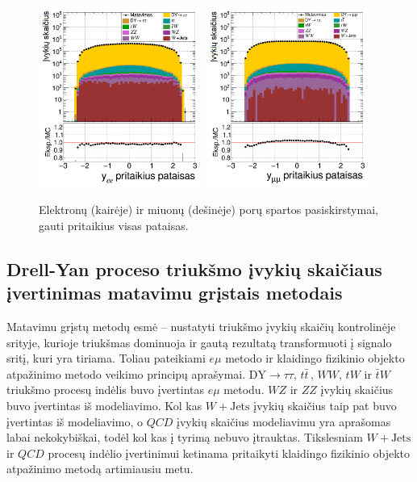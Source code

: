 \documentclass[a4paper, 12pt, oneside]{article}
\newcommand{\emu}{e\mu}
\newcommand{\WJets}{W\! +\!\mathrm{Jets}}
\newcommand{\DYtau}{\mathrm{DY} \! \rightarrow \! \tau\tau}
\newcommand{\QCD}{QC\! D}
\begin{document}
\begin{figure}[H]
	\includegraphics[width=0.48\textwidth]{ee_rapi_after.png}
	\includegraphics[width=0.48\textwidth]{mumu_rapi_after.png}
	\caption{\label{fig:rapia} Elektronų (kairėje) ir miuonų (dešinėje) porų spartos pasiskirstymai,
		gauti pritaikius visas pataisas.}
\end{figure}

\subsection{Drell-Yan proceso triukšmo įvykių skaičiaus įvertinimas matavimu grįstais metodais}
Matavimu grįstų metodų esmė -- nustatyti triukšmo įvykių skaičių kontrolinėje srityje, kurioje triukšmas dominuoja
ir gautą rezultatą transformuoti į signalo sritį, kuri yra tiriama.
Toliau pateikiami $\emu$ metodo ir klaidingo fizikinio objekto atpažinimo metodo veikimo principų aprašymai.
$\DYtau$, $t\bar{t}\,$, $WW$, $tW$ ir $\bar{t}W$ triukšmo procesų indėlis buvo įvertintas $\emu$ metodu.
$WZ$ ir $ZZ$ įvykių skaičius buvo įvertintas iš modeliavimo.
Kol kas $\WJets$ įvykių skaičius taip pat buvo įvertintas iš modeliavimo, o $\QCD$ įvykių skaičius modeliavimu yra
aprašomas labai nekokybiškai, todėl kol kas į tyrimą nebuvo įtrauktas.
Tikslesniam $\WJets$ ir $\QCD$ procesų indėlio įvertinimui ketinama pritaikyti klaidingo
fizikinio objekto atpažinimo metodą artimiausiu metu.
\end{document}
